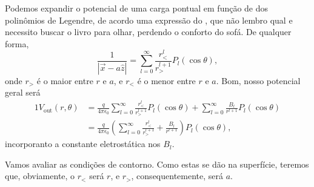 \documentclass{article}
\begin{document}
Podemos expandir o potencial de uma carga pontual em função de dos polinômios de Legendre, de acordo uma expressão do
,
que não lembro qual e necessito buscar o livro para olhar, perdendo o conforto do sofá. De qualquer forma,
\begin{equation}
 \frac{1}{|\vec{x} - a\hat{z}|} = \sum_{l = 0}^{\infty} \frac{r_{<}^l}{r_{>}^{l+1}} P_l(\cos{\theta})\mathrm{,}
\end{equation}
onde $r_>$ é o maior entre $r$ e $a$, e $r_<$ é o menor entre $r$ e $a$. Bom, nosso potencial geral será
\begin{alignat}{1}
 V_{\mathrm{out}}(r,\theta) &= \frac{q}{4 \pi \epsilon_0} \sum_{l = 0}^{\infty} \frac{r_{<}^l}{r_{>}^{l+1}} P_l(\cos{\theta}) +
 \sum_{l = 0}^{\infty} \frac{B_l}{r^{l+1}} P_l (\cos{\theta}) \\
 &= \frac{q}{4 \pi \epsilon_0} \left( \sum_{l = 0}^{\infty} \frac{r_{<}^l}{r_{>}^{l+1}} + \frac{B_l}{r^{l+1}} \right) P_l (\cos{\theta}) \mathrm{,}
\end{alignat}
incorporanto a constante eletrostática nos $B_l$.

Vamos avaliar as condições de contorno. Como estas se dão na superfície, teremos que, obviamente, o $r_<$ será $r$, e $r_>$, consequentemente, será $a$.
\end{document}
